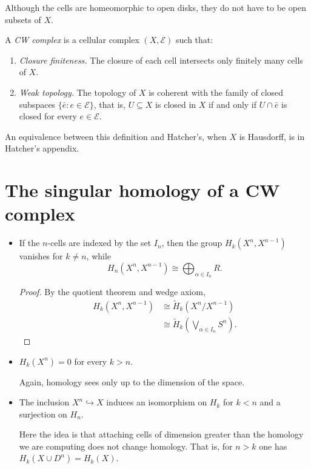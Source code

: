\begin{remark}
Although the cells are homeomorphic to open
disks, they do
not have to be open subsets of $X$.
\end{remark}

\begin{definition}
A \emph{CW complex} is a cellular complex
$(X,\mathcal E)$
such that:
\begin{enumerate}
\item[\emph{C}] \emph{Closure finiteness.}
The closure of
each cell intersects only finitely many cells
of $X$.
\item[\emph{W}] \emph{Weak topology.} The
topology of $X$
is coherent with the family of closed
subspaces
$\{\bar e:e\in\mathcal E\}$, that is,
$U\subseteq X$ is closed
in $X$ if and only if $U\cap\bar e$ is closed
for every
$e\in\mathcal E$.
\end{enumerate}
An equivalence between this definition and
Hatcher's, when
$X$ is Hausdorff, is in Hatcher's appendix.
\end{definition}
\section{The singular homology of a CW
complex}
\label{section-singular-homology-cw}

\begin{lemma}
\begin{itemize}
\item If the $n$-cells are indexed by the set
$I_n$, then
the group $H_k(X^n,X^{n-1})$ vanishes for
$k\neq n$, while
$$
H_n(X^n,X^{n-1})
\cong\bigoplus_{\alpha\in I_n}R.
$$
\begin{proof}
By the quotient theorem and wedge axiom,
$$
\begin{aligned}
H_k(X^n,X^{n-1})
&\cong\tilde H_k(X^n/X^{n-1})\\
&\cong\tilde H_k
\left(\bigvee_{\alpha\in I_n}S^n\right).
\end{aligned}
$$
\end{proof}
\item $H_k(X^n)=0$ for every $k>n$.

Again, homology sees only up to the dimension
of the space.
\item The inclusion $X^n\hookrightarrow X$
induces an isomorphism on $H_k$ for $k<n$
and a surjection on $H_n$.

Here the idea is that attaching cells of
dimension greater
than the homology we are computing does not
change homology.
That is, for $n>k$ one has $H_k(X\cup
D^n)=H_k(X)$.
\end{itemize}
\end{lemma}

